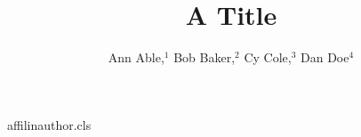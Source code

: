 \begin{filecontents*}[overwrite]{affilinauthor.cls}
\def\affilfont{\small}
\def\affil#1{\par{\reset@font\affilfont#1\par}}
\def\address#1{\par{\reset@font\affilfont#1\par}}
\def\@maketitle{\newpage{\Large\bfseries\@title\par}\vskip1em\noindent{\bfseries\@author\par}\vskip1em}
\end{filecontents*}
\documentclass{affilinauthor}

\title{A Title}
\author{Ann Able,$^1$ Bob Baker,$^2$ Cy Cole,$^3$ Dan Doe$^4$
}
\maketitle
Body.

